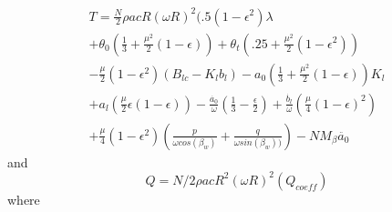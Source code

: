 \documentclass[letterpaper, 10 pt, conference]{ieeeconf}  %
\begin{document}
\begin{multline}
T = \frac{N}{2} \rho a c R (\omega R)^2 (.5 (1-\epsilon^2) \lambda \\
 + \theta_0 (\frac{1}{3} + \frac{\mu^2}{2} (1-\epsilon)) + \theta_t (.25+\frac{\mu^2}{2} (1-\epsilon^2))\\
- \frac{\mu}{2} (1-\epsilon^2) (B_{lc}-K_l b_l) - a_0 (\frac{1}{3} +\frac{\mu^2}{2} (1-\epsilon)) K_l \\
+ a_l (\frac{\mu}{2} \epsilon (1-\epsilon)) - \frac{\dot{a_0}}{\omega} (\frac{1}{3} -\frac{\epsilon}{2}) + \frac{\dot{b_l}}{\omega} (\frac{\mu}{4} (1-\epsilon)^2) \\
+ \frac{\mu}{4} (1-\epsilon^2) (\frac{p}{\omega cos(\beta_w)} + \frac{q}{\omega sin(\beta_w))} ) - N M_\beta \ddot{a_0}
\label{thrust}
\end{multline}
and
\begin{equation}
Q = N/2 \rho a c R^2 (\omega R)^2 (Q_{coeff})
\label{torque}
\end{equation}
where
\end{document}
